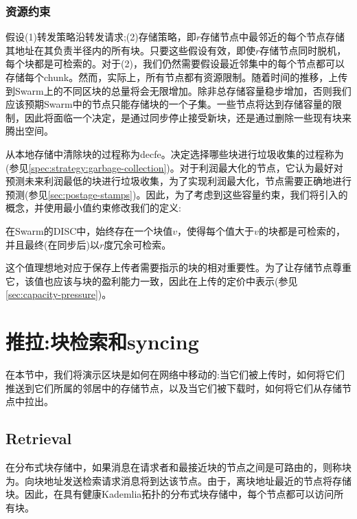 \subsubsection{资源约束}

假设(1)转发策略沿转发请求;(2)存储策略，即$r$存储节点中最邻近的每个节点存储其地址在其负责半径内的所有块。只要这些假设有效，即使$r$存储节点同时脱机，每个块都是可检索的。对于(2)，我们仍然需要假设最近邻集中的每个节点都可以存储每个chunk。然而，实际上，所有节点都有资源限制。随着时间的推移，上传到Swarm上的不同区块的总量将会无限增加。除非总存储容量稳步增加，否则我们应该预期Swarm中的节点只能存储块的一个子集。一些节点将达到存储容量的限制，因此将面临一个决定，是通过同步停止接受新块，还是通过删除一些现有块来腾出空间。 

从本地存储中清除块的过程称为decfe。决定选择哪些块进行垃圾收集的过程称为(参见\ref{spec:strategy:garbage-collection})。对于利润最大化的节点，它认为最好对预测未来利润最低的块进行垃圾收集，为了实现利润最大化，节点需要正确地进行预测(参见\ref{sec:postage-stamps})。因此，为了考虑到这些容量约束，我们将引入的概念，并使用最小值约束修改我们的定义:

在Swarm的DISC中，始终存在一个块值$v$，使得每个值大于$v$的块都是可检索的，并且最终(在同步后)以$r$度冗余可检索。 

这个值理想地对应于保存上传者需要指示的块的相对重要性。为了让存储节点尊重它，该值也应该与块的盈利能力一致，因此在上传的定价中表示(参见\ref{sec:capacity-pressure})。


\section{推拉:块检索和syncing\statusgreen}\label{sec:push-and-pull}
\green{}
在本节中，我们将演示区块是如何在网络中移动的:当它们被上传时，如何将它们推送到它们所属的邻居中的存储节点，以及当它们被下载时，如何将它们从存储节点中拉出。

\subsection{Retrieval\statusgreen}\label{sec:retrieval}

在分布式块存储中，如果消息在请求者和最接近块的节点之间是可路由的，则称块为。向块地址发送检索请求消息将到达该节点。由于，离块地址最近的节点将存储块。因此，在具有健康Kademlia拓扑的分布式块存储中，每个节点都可以访问所有块。

